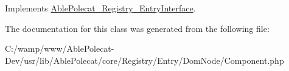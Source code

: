 Implements \hyperlink{interface_able_polecat___registry___entry_interface_afc8a3c62679cf00ade9f15fb2a6d6132}{Able\+Polecat\+\_\+\+Registry\+\_\+\+Entry\+Interface}.



The documentation for this class was generated from the following file\+:\begin{DoxyCompactItemize}
\item 
C\+:/wamp/www/\+Able\+Polecat-\/\+Dev/usr/lib/\+Able\+Polecat/core/\+Registry/\+Entry/\+Dom\+Node/Component.\+php\end{DoxyCompactItemize}
